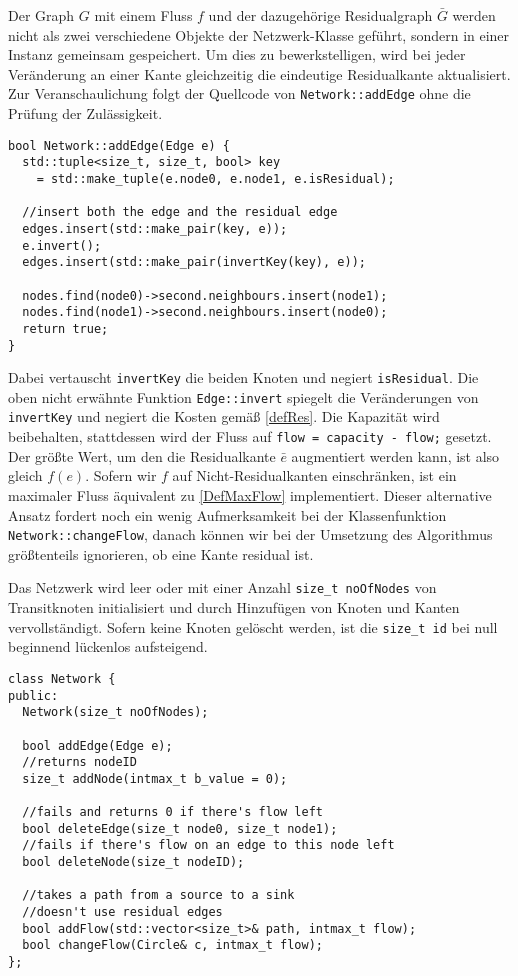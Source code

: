 Der Graph $G$ mit einem Fluss $f$ und der dazugehörige Residualgraph $\bar{G}$ werden nicht als zwei verschiedene Objekte der Netzwerk-Klasse geführt, sondern in einer Instanz gemeinsam gespeichert. Um dies zu bewerkstelligen, wird bei jeder Veränderung an einer Kante gleichzeitig die eindeutige Residualkante aktualisiert. Zur Veranschaulichung folgt der Quellcode von \lstinline|Network::addEdge| ohne die Prüfung der Zulässigkeit.

\begin{lstlisting}
bool Network::addEdge(Edge e) {
  std::tuple<size_t, size_t, bool> key
    = std::make_tuple(e.node0, e.node1, e.isResidual);

  //insert both the edge and the residual edge
  edges.insert(std::make_pair(key, e));
  e.invert();
  edges.insert(std::make_pair(invertKey(key), e));

  nodes.find(node0)->second.neighbours.insert(node1);
  nodes.find(node1)->second.neighbours.insert(node0);
  return true;
}
\end{lstlisting}

Dabei vertauscht \lstinline|invertKey| die beiden Knoten und negiert \lstinline|isResidual|. Die oben nicht erwähnte Funktion \lstinline|Edge::invert| spiegelt die Veränderungen von \lstinline|invertKey| und negiert die Kosten gemäß \cref{defRes}. Die Kapazität wird beibehalten, stattdessen wird der Fluss auf \lstinline|flow = capacity - flow;| gesetzt. Der größte Wert, um den die Residualkante $\bar{e}$ augmentiert werden kann, ist also gleich $f(e)$. Sofern wir $f$ auf Nicht-Residualkanten einschränken, ist ein maximaler Fluss äquivalent zu \cref{DefMaxFlow} implementiert. Dieser alternative Ansatz fordert noch ein wenig Aufmerksamkeit bei der Klassenfunktion \lstinline|Network::changeFlow|,\footnotemark{} danach können wir bei der Umsetzung des Algorithmus größtenteils ignorieren, ob eine Kante residual ist.


Das Netzwerk wird leer oder mit einer Anzahl \lstinline|size_t noOfNodes| von Transitknoten initialisiert und durch Hinzufügen von Knoten und Kanten vervollständigt. Sofern keine Knoten gelöscht werden, ist die \lstinline|size_t id| bei null beginnend lückenlos aufsteigend.

\begin{lstlisting}
class Network {
public:
  Network(size_t noOfNodes);

  bool addEdge(Edge e);
  //returns nodeID
  size_t addNode(intmax_t b_value = 0);
  
  //fails and returns 0 if there's flow left
  bool deleteEdge(size_t node0, size_t node1);
  //fails if there's flow on an edge to this node left
  bool deleteNode(size_t nodeID);

  //takes a path from a source to a sink
  //doesn't use residual edges
  bool addFlow(std::vector<size_t>& path, intmax_t flow);
  bool changeFlow(Circle& c, intmax_t flow);
};
\end{lstlisting}


